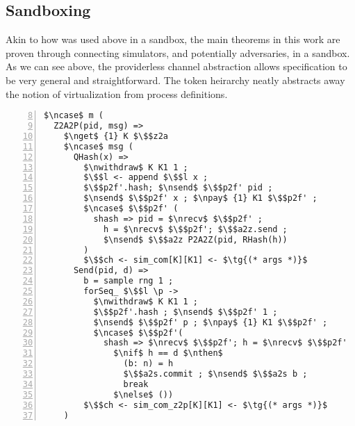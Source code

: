 \subsection{Sandboxing}
Akin to how \Fro was used above in a sandbox, the main theorems in this work are proven through connecting simulators, and potentially adversaries, in a sandbox. 
As we can see above, the providerless channel abstraction allows specification to be very general and straightforward. 
The token heirarchy neatly abstracts away the notion of virtualization from process definitions. 


\begin{lstlisting}[basicstyle=\footnotesize\BeraMonottFamily, mathescape, frame=single, numbers=left, xleftmargin=2em, xrightmargin=2em, firstnumber=8]
$\ncase$ m (
  Z2A2P(pid, msg) =>
    $\nget$ {1} K $\$$z2a
    $\ncase$ msg (
      QHash(x) => 
        $\nwithdraw$ K K1 1 ;
        $\$$l <- append $\$$l x ;
        $\$$p2f'.hash; $\nsend$ $\$$p2f' pid ; 
        $\nsend$ $\$$p2f' x ; $\npay$ {1} K1 $\$$p2f' ;
        $\ncase$ $\$$p2f' (
          shash => pid = $\nrecv$ $\$$p2f' ; 
            h = $\nrecv$ $\$$p2f'; $\$$a2z.send ; 
            $\nsend$ $\$$a2z P2A2Z(pid, RHash(h))
        )
        $\$$ch <- sim_com[K][K1] <- $\tg{(* args *)}$
      Send(pid, d) =>
        b = sample rng 1 ;
        forSeq_ $\$$l \p ->
          $\nwithdraw$ K K1 1 ;
          $\$$p2f'.hash ; $\nsend$ $\$$p2f' 1 ; 
          $\nsend$ $\$$p2f' p ; $\npay$ {1} K1 $\$$p2f' ;
          $\ncase$ $\$$p2f'( 
            shash => $\nrecv$ $\$$p2f'; h = $\nrecv$ $\$$p2f'
              $\nif$ h == d $\nthen$
                (b: n) = h 
                $\$$a2s.commit ; $\nsend$ $\$$a2s b ;
                break
              $\nelse$ ())
        $\$$ch <- sim_com_z2p[K][K1] <- $\tg{(* args *)}$
    )
\end{lstlisting}






